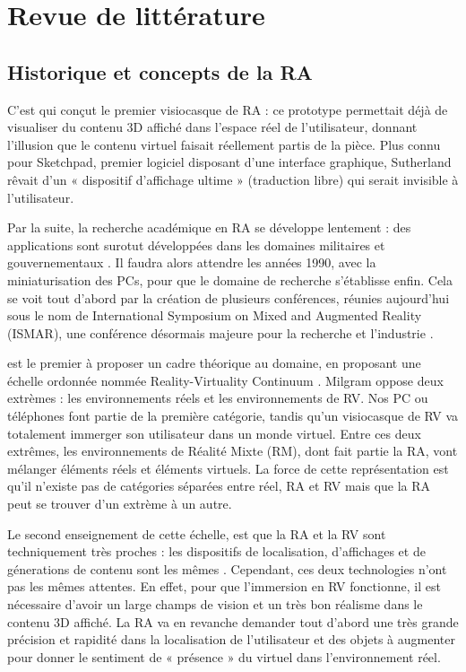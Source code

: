 \chapter{Revue de littérature}
\label{ch:litterature}

\section{Historique et concepts de la RA}
C'est \cite{Sutherland1968} qui conçut le premier visiocasque de RA  : ce prototype permettait déjà de visualiser du contenu 3D affiché dans l'espace réel de l'utilisateur, donnant l'illusion que le contenu virtuel faisait réellement partis de la pièce. Plus connu pour Sketchpad, premier logiciel disposant d'une interface graphique, Sutherland rêvait d'un « dispositif d'affichage ultime » (traduction libre) qui serait invisible à l'utilisateur. 


Par la suite, la recherche académique en RA se développe lentement : des applications sont surotut développées dans les domaines militaires et gouvernementaux \citep{VanKrevelen2010}. Il faudra alors attendre les années 1990, avec la miniaturisation des PCs, pour que le domaine de recherche s'établisse enfin. Cela se voit tout d'abord par la création de plusieurs conférences, réunies aujourd'hui sous le nom de International Symposium on Mixed and Augmented Reality (ISMAR), une conférence désormais majeure pour la recherche et l'industrie \citep{Azuma2001}.

\cite{Milgram1994} est le premier à proposer un cadre théorique au domaine, en proposant une échelle ordonnée nommée \foreignlanguage{english}{Reality-Virtuality Continuum} . Milgram oppose deux extrèmes : les environnements réels et les environnements de RV. Nos PC ou téléphones font partie de la première catégorie, tandis qu'un visiocasque de RV va totalement immerger son utilisateur dans un monde virtuel. Entre ces deux extrêmes, les environnements de Réalité Mixte (RM), dont fait partie la RA, vont mélanger éléments réels et éléments virtuels. La force de cette représentation est qu'il n'existe pas de catégories séparées entre réel, RA et RV mais que la RA peut se trouver d'un extrème à un autre.

Le second enseignement de cette échelle, est que la RA et la RV sont techniquement très proches : les dispositifs de localisation, d'affichages et de génerations de contenu sont les mêmes \citep{Billinghurst2015}. Cependant, ces deux technologies n'ont pas les mêmes attentes. En effet, pour que l'immersion en RV fonctionne, il est nécessaire d'avoir un large champs de vision et un très bon réalisme dans le contenu 3D affiché. La RA va en revanche demander tout d'abord une très grande précision et rapidité dans la localisation de l'utilisateur et des objets à augmenter pour donner le sentiment de « présence » du virtuel dans l'environnement réel.

